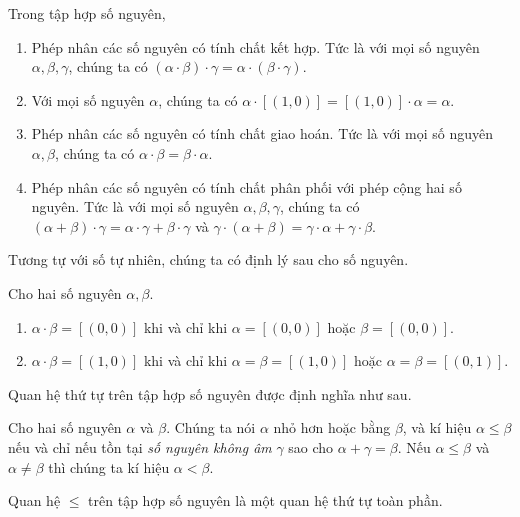 \begin{theorem}\label{theorem:property-of-integers-multiplication}
    Trong tập hợp số nguyên,
    \begin{enumerate}[label={(\roman*)}]
        \item Phép nhân các số nguyên có tính chất kết hợp. Tức là với mọi số nguyên $\alpha, \beta, \gamma$, chúng ta có $(\alpha\cdot\beta)\cdot\gamma = \alpha\cdot(\beta\cdot\gamma)$.
        \item Với mọi số nguyên $\alpha$, chúng ta có $\alpha\cdot [(1, 0)] = [(1, 0)]\cdot\alpha = \alpha$.
        \item Phép nhân các số nguyên có tính chất giao hoán. Tức là với mọi số nguyên $\alpha, \beta$, chúng ta có $\alpha\cdot\beta = \beta\cdot\alpha$.
        \item Phép nhân các số nguyên có tính chất phân phối với phép cộng hai số nguyên. Tức là với mọi số nguyên $\alpha, \beta, \gamma$, chúng ta có $(\alpha + \beta)\cdot\gamma = \alpha\cdot\gamma + \beta\cdot\gamma$ và $\gamma\cdot(\alpha + \beta) = \gamma\cdot\alpha + \gamma\cdot\beta$.
    \end{enumerate}
\end{theorem}

Tương tự với số tự nhiên, chúng ta có định lý sau cho số nguyên.
\begin{theorem}
    Cho hai số nguyên $\alpha, \beta$.
    \begin{enumerate}[label={(\roman*)}]
        \item $\alpha\cdot\beta = [(0,0)]$ khi và chỉ khi $\alpha = [(0,0)]$ hoặc $\beta = [(0,0)]$.
        \item $\alpha\cdot\beta = [(1,0)]$ khi và chỉ khi $\alpha = \beta = [(1, 0)]$ hoặc $\alpha = \beta = [(0,1)]$.
    \end{enumerate}
\end{theorem}

Quan hệ thứ tự trên tập hợp số nguyên được định nghĩa như sau.
\begin{definition}
    Cho hai số nguyên $\alpha$ và $\beta$. Chúng ta nói $\alpha$ nhỏ hơn hoặc bằng $\beta$, và kí hiệu $\alpha\leq \beta$ nếu và chỉ nếu tồn tại \textit{số nguyên không âm} $\gamma$ sao cho $\alpha + \gamma = \beta$. Nếu $\alpha\leq \beta$ và $\alpha\ne \beta$ thì chúng ta kí hiệu $\alpha < \beta$.
\end{definition}

\begin{theorem}
    Quan hệ $\leq$ trên tập hợp số nguyên là một quan hệ thứ tự toàn phần.
\end{theorem}

